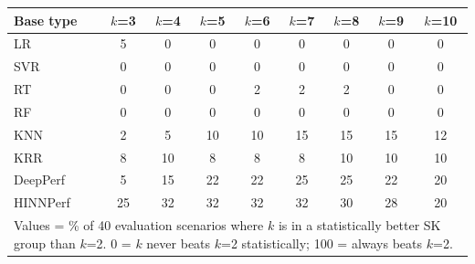 \begin{tabular}{lcccccccc}
\toprule
Base type & $k$=3 & $k$=4 & $k$=5 & $k$=6 & $k$=7 & $k$=8 & $k$=9 & $k$=10 \\
\midrule
LR & 5 & 0 & 0 & 0 & 0 & 0 & 0 & 0 \\
SVR & 0 & 0 & 0 & 0 & 0 & 0 & 0 & 0 \\
RT & 0 & 0 & 0 & 2 & 2 & 2 & 0 & 0 \\
RF & 0 & 0 & 0 & 0 & 0 & 0 & 0 & 0 \\
KNN & 2 & 5 & 10 & 10 & 15 & 15 & 15 & 12 \\
KRR & 8 & 10 & 8 & 8 & 8 & 10 & 10 & 10 \\
DeepPerf & 5 & 15 & 22 & 22 & 25 & 25 & 22 & 20 \\
HINNPerf & 25 & 32 & 32 & 32 & 32 & 30 & 28 & 20 \\
\bottomrule
\multicolumn{9}{l}{\footnotesize Values = \% of 40 evaluation scenarios where $k$ is in a statistically better SK group than $k$=2. 0 = $k$ never beats $k$=2 statistically; 100 = always beats $k$=2.}} \\
\end{tabular}
